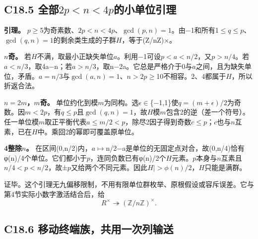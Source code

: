 \documentclass[11pt,a4paper]{article}
\theoremstyle{definition}
\numberwithin{equation}{section}
\begin{document}
\subsection*{\texorpdfstring{{C18.5} {全部\ensuremath{2p<n<4p}的小单位引理}}{C18.5 全部的小单位引理}}\label{C18-h136}

\textbf{{引理。}} {\ensuremath{p}\ensuremath{\ge}5为奇素数、\ensuremath{2p<n<4p}、\ensuremath{\operatorname{gcd}(p,n)=1}。由−1和所有1\ensuremath{\le}\ensuremath{q}\ensuremath{\le}\ensuremath{p}、\ensuremath{\operatorname{gcd}(q,n)=1}的剩余类生成的子群\ensuremath{H}，等于(Z/nZ)×。}

\textbf{{\ensuremath{n}奇。}} {若\ensuremath{H}不满，取最小正缺失单位\ensuremath{a}。利用−1可设\ensuremath{p<a<n/2}，又\ensuremath{p>n/4}。若\ensuremath{a<n/3}，取4a−n；若\ensuremath{a>n/3}，取n−2a。它总是严格介于0与\ensuremath{a}之间，且为缺失单位，矛盾。\ensuremath{a=n/3}与\ensuremath{\operatorname{gcd}(a,n)=1}、\ensuremath{n>2p}\ensuremath{\ge}10不相容。2、4都属于\ensuremath{H}，所以折返合法。}

\textbf{{\ensuremath{n=2m}，\ensuremath{m}奇。}} {单位约化到模\ensuremath{m}为同构。选\ensuremath{\epsilon }\ensuremath{\in}\{−1,1\}使\ensuremath{q=(m+\epsilon )/2}为奇数。因\ensuremath{m<2p}，有\ensuremath{q}\ensuremath{\le}\ensuremath{p}且\ensuremath{\operatorname{gcd}(q,n)=1}，故\ensuremath{H}模\ensuremath{m}包含2的逆（差一个符号）。任一单位模\ensuremath{m}取正平衡代表\ensuremath{a}\ensuremath{\le}\ensuremath{m/2<p}，除尽2因子得到奇数\ensuremath{c}\ensuremath{\le}\ensuremath{p}；\ensuremath{c}也与\ensuremath{n}互素，已在\ensuremath{H}中。乘回2的幂即可覆盖原单位。}

\textbf{{4整除\ensuremath{n}。}} {在区间(0,n/2)内，\ensuremath{a}\ensuremath{\mapsto}n/2−a是单位的无固定点对合，故(0,n/4)恰有φ(n)/4个单位。它们都小于\ensuremath{p}，连同负数已有φ(n)/2个\ensuremath{H}元素。\ensuremath{p}本身与\ensuremath{n}互素且\ensuremath{n/4<p<n/2}，故±\ensuremath{p}又给两个不同元素。因此\textbar{}\ensuremath{H|>\phi (n)/2}，\ensuremath{H}只能是满群。}

{证毕。这个引理无九偏移限制，不用有限单位群枚举、原根假设或容斥误差。它与第4节实际小数字激活结合后，给} \[
\boxed{R^\times\twoheadrightarrow(\mathbb Z/n\mathbb Z)^\times.}
\tag{C18.5.1}
\]

\subsection*{\texorpdfstring{{C18.6} {移动终端族，共用一次列输送}}{C18.6 移动终端族，共用一次列输送}}\label{C18-h137}
\end{document}
